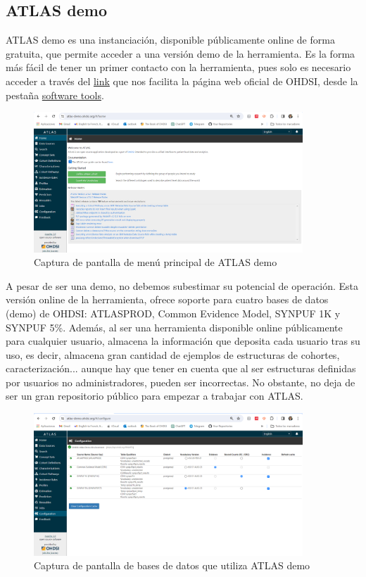 \documentclass{article}
\begin{document}
\subsection{ATLAS demo} \label{cap:ATLASdemo}

ATLAS demo es una instanciación, disponible públicamente online de forma gratuita, que permite acceder a una versión demo de la herramienta. Es la forma más fácil de tener un primer contacto con la herramienta, pues solo es necesario acceder a través del  \href{https://atlas-demo.ohdsi.org/}{link} que nos facilita la página web oficial de OHDSI, desde la pestaña \href{https://atlas-demo.ohdsi.org/}{software tools}. \\

\begin{figure}[H]
    \centering
    \includegraphics[width=0.90\textwidth]{images/atlasDemo.png}
    \caption{Captura de pantalla de menú principal de ATLAS demo}
\end{figure}

A pesar de ser una demo, no debemos subestimar su potencial de operación. Esta versión online de la herramienta, ofrece soporte para cuatro bases de datos (demo) de OHDSI: ATLASPROD, Common Evidence Model, SYNPUF 1K y SYNPUF 5\%. Además, al ser una herramienta disponible online públicamente para cualquier usuario, almacena la información que deposita cada usuario tras su uso, es decir, almacena gran cantidad de ejemplos de estructuras de cohortes, caracterización... aunque hay que tener en cuenta que al ser estructuras definidas por usuarios no administradores, pueden ser incorrectas. No obstante, no deja de ser un gran repositorio público para empezar a trabajar con ATLAS. \\

\begin{figure}[H]
    \centering
    \includegraphics[width=0.90\textwidth]{images/atlasDemo(1).png}
    \caption{Captura de pantalla de bases de datos que utiliza ATLAS demo}
\end{figure}
\end{document}
